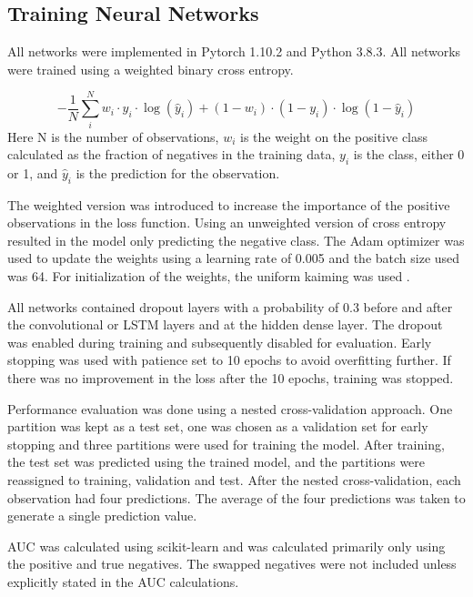 \subsection{Training Neural Networks} \label{training}
All networks were implemented in Pytorch 1.10.2 \cite{Paszke2019PyTorch:Library} and Python 3.8.3. All networks were trained using a weighted binary cross entropy.

\begin{equation}
    - \frac{1}{N} \sum_i^N w_i \cdot y_i \cdot \log(\hat{y}_i) + (1-w_i) \cdot (1-y_i) \cdot \log(1 - \hat{y}_i)
\end{equation}
Here N is the number of observations, $w_i$ is the weight on the positive class calculated as the fraction of negatives in the training data, $y_i$ is the class, either 0 or 1, and $\hat{y}_i$ is the prediction for the observation.

The weighted version was introduced to increase the importance of the positive observations in the loss function. Using an unweighted version of cross entropy resulted in the model only predicting the negative class. The Adam optimizer was used to update the weights using a learning rate of 0.005 \cite{KingmaADAM:OPTIMIZATION} and the batch size used was 64. For initialization of the weights, the uniform kaiming was used \cite{https://doi.org/10.48550/arxiv.1502.01852}.

All networks contained dropout layers with a probability of 0.3 before and after the convolutional or LSTM layers and at the hidden dense layer. The dropout was enabled during training and subsequently disabled for evaluation. Early stopping was used with patience set to 10 epochs to avoid overfitting further. If there was no improvement in the loss after the 10 epochs, training was stopped.

Performance evaluation was done using a nested cross-validation approach. One partition was kept as a test set, one was chosen as a validation set for early stopping and three partitions were used for training the model. After training, the test set was predicted using the trained model, and the partitions were reassigned to training, validation and test. After the nested cross-validation, each observation had four predictions. The average of the four predictions was taken to generate a single prediction value.

AUC was calculated using scikit-learn and was calculated primarily only using the positive and true negatives. The swapped negatives were not included unless explicitly stated in the AUC calculations.

